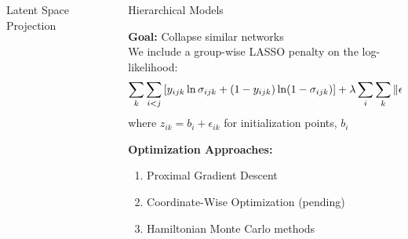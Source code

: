 \documentclass[final]{beamer}
\newlength{\onecolwid}
\newlength{\twocolwid}
\begin{document}
\begin{frame}[t]
\begin{columns}[t]
\begin{column}{\twocolwid}
\begin{columns}[t,totalwidth=\twocolwid]
\begin{column}{\onecolwid}
\begin{block}{Latent Space Projection}

\end{block}


\end{column} %

\begin{column}{\onecolwid}\vspace{-.6in} %


  \begin{block}{Hierarchical Models}

    \textbf{Goal:} Collapse similar networks\\
    We include a group-wise LASSO penalty on the log-likelihood:
    \[\sum_k\sum_{i<j} \left[y_{ijk} \ln \sigma_{ijk}
        + (1-y_{ijk})\ln (1-\sigma_{ijk})\right] +
    \lambda\sum_i \sum_k \left\|\epsilon_{ik}\right\|_1\]
  where $z_{ik} = b_i + \epsilon_{ik}$ for initialization points, $b_i$


\textbf{Optimization Approaches:}
\begin{enumerate}
\item Proximal Gradient Descent
\item Coordinate-Wise Optimization (pending)
\item Hamiltonian Monte Carlo methods
\end{enumerate}



\end{block}
\end{column}
\end{columns}
\end{column}
\end{columns}
\end{frame}
\end{document}
